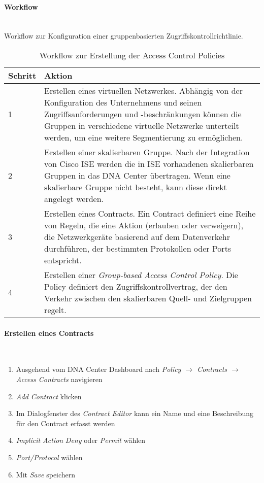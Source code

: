 \paragraph{Workflow}
~\\
Workflow zur Konfiguration einer gruppenbasierten Zugriffskontrollrichtlinie.

\begin{table}[H]
	\centering
	\begin{tabularx}{\textwidth}{| p{2 cm} | X |}
		\rowcolor{gray!50}
		\hline
		\textbf{Schritt} & \textbf{Aktion}  \\
		\hline	
		1 & Erstellen eines virtuellen Netzwerkes. Abhängig von der Konfiguration des Unternehmens und seinen Zugriffsanforderungen und -beschränkungen können die Gruppen in verschiedene virtuelle Netzwerke unterteilt werden, um eine weitere Segmentierung zu ermöglichen. \\
		\hline
		2 & Erstellen einer skalierbaren Gruppe. Nach der Integration von Cisco ISE werden die in ISE vorhandenen skalierbaren Gruppen in das DNA Center übertragen. Wenn eine skalierbare Gruppe nicht besteht, kann diese direkt angelegt werden. \\
		\hline
		3 & Erstellen eines Contracts. Ein Contract definiert eine Reihe von Regeln, die eine Aktion (erlauben oder verweigern), die Netzwerkgeräte basierend auf dem Datenverkehr durchführen, der bestimmten Protokollen oder Ports entspricht.  \\
		\hline
		4 & Erstellen einer \textit{Group-based Access Control Policy}. Die Policy definiert den Zugriffskontrollvertrag, der den Verkehr zwischen den skalierbaren Quell- und Zielgruppen regelt. \\
		\hline
	\end{tabularx}
	\caption{Workflow zur Erstellung der Access Control Policies}
	\label{tab:Workflow zur Erstellung der Access Control Policies}
\end{table}

\paragraph{Erstellen eines Contracts}
~\\
\begin{enumerate}
	\item Ausgehend vom DNA Center Dashboard nach \textit{Policy $\rightarrow$ Contracts $\rightarrow$ Access Contracts} navigieren
	\item \textit{Add Contract} klicken
	\item Im Dialogfenster des \textit{Contract Editor} kann ein Name und eine Beschreibung für den Contract erfasst werden
	\item \textit{Implicit Action} \textit{Deny} oder \textit{Permit} wählen
	\item \textit{Port/Protocol} wählen
	\item Mit \textit{Save} speichern
\end{enumerate}

